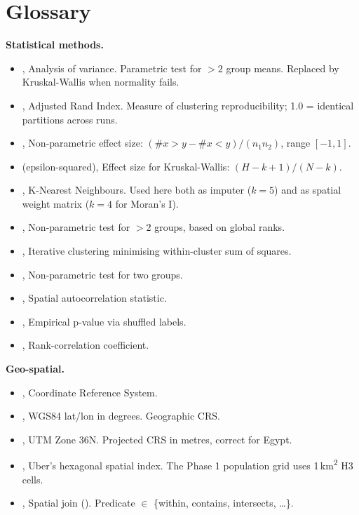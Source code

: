 \section{Glossary}
\label{sec:glossary}

\textbf{Statistical methods.}

\begin{itemize}
 \item {}, Analysis of variance. Parametric test for $> 2$
 group means. Replaced by Kruskal-Wallis when normality fails.
 \item {}, Adjusted Rand Index. Measure of clustering
 reproducibility; 1.0 = identical partitions across runs.
 \item {}, Non-parametric effect size:
 $(\#x>y - \#x<y) / (n_1 n_2)$, range $[-1, 1]$.
 \item {} (epsilon-squared), Effect size for
 Kruskal-Wallis: $(H - k + 1)/(N - k)$.
 \item {}, K-Nearest Neighbours. Used here both as imputer
 ($k=5$) and as spatial weight matrix ($k=4$ for Moran's I).
 \item {}, Non-parametric test for $> 2$ groups,
 based on global ranks.
 \item {}, Iterative clustering minimising within-cluster
 sum of squares.
 \item {}, Non-parametric test for two groups.
 \item {}, Spatial autocorrelation statistic.
 \item {}, Empirical p-value via shuffled labels.
 \item {}, Rank-correlation coefficient.
\end{itemize}

\textbf{Geo-spatial.}

\begin{itemize}
 \item {}, Coordinate Reference System.
 \item {}, WGS84 lat/lon in degrees. Geographic CRS.
 \item {}, UTM Zone 36N. Projected CRS in metres,
 correct for Egypt.
 \item {}, Uber's hexagonal spatial index. The Phase 1
 population grid uses 1\,km\textsuperscript{2} H3 cells.
 \item {}, Spatial join (). Predicate
 $\in$ \{within, contains, intersects, \ldots\}.
\end{itemize}

